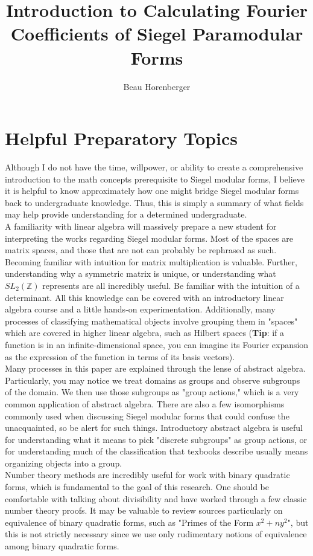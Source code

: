 \documentclass[11pt, oneside]{amsart}
\title{Introduction to Calculating Fourier Coefficients of Siegel Paramodular Forms}
\author{Beau Horenberger}
\begin{document}
\maketitle
\tableofcontents
\section{Helpful Preparatory Topics}
Although I do not have the time, willpower, or ability to create a comprehensive introduction to the math concepts prerequisite to Siegel modular forms, I believe it is helpful to know approximately how one might bridge Siegel modular forms back to undergraduate knowledge. Thus, this is simply a summary of what fields may help provide understanding for a determined undergraduate.\\
A familiarity with linear algebra will massively prepare a new student for interpreting the works regarding Siegel modular forms. Most of the spaces are matrix spaces, and those that are not can probably be rephrased as such. Becoming familiar with intuition for matrix multiplication is valuable. Further, understanding why a symmetric matrix is unique, or understanding what $SL_2(\mathbb{Z})$ represents are all incredibly useful. Be familiar with the intuition of a determinant. All this knowledge can be covered with an introductory linear algebra course and a little hands-on experimentation. Additionally, many processes of classifying mathematical objects involve grouping them in "spaces" which are covered in higher linear algebra, such as Hilbert spaces (\textbf{Tip}: if a function is in an infinite-dimensional space, you can imagine its Fourier expansion as the expression of the function in terms of its basis vectors).\\
Many processes in this paper are explained through the lense of abstract algebra. Particularly, you may notice we treat domains as groups and observe subgroups of the domain. We then use those subgroups as "group actions," which is a very common application of abstract algebra. There are also a few isomorphisms commonly used when discussing Siegel modular forms that could confuse the unacquainted, so be alert for such things. Introductory abstract algebra is useful for understanding what it means to pick "discrete subgroups" as group actions, or for understanding much of the classification that texbooks describe usually means organizing objects into a group.\\
Number theory methods are incredibly useful for work with binary quadratic forms, which is fundamental to the goal of this research. One should be comfortable with talking about divisibility and have worked through a few classic number theory proofs. It may be valuable to review sources particularly on equivalence of binary quadratic forms, such as "Primes of the Form $x^2+ny^2$", but this is not strictly necessary since we use only rudimentary notions of equivalence among binary quadratic forms.\\
\end{document}
